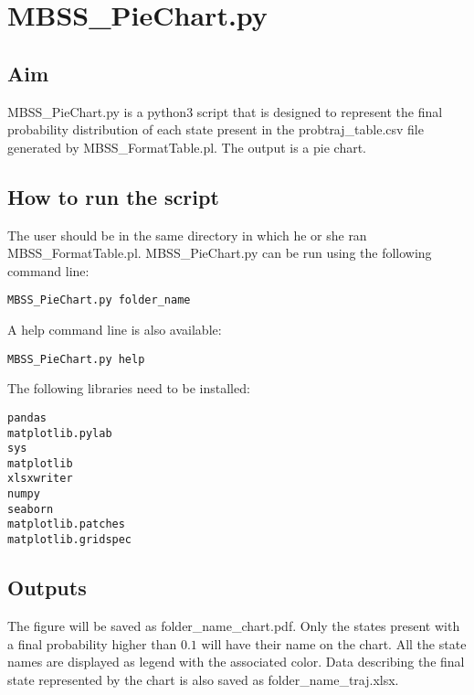 \documentclass{article}
\begin{document}
\section*{MBSS\_PieChart.py}
\subsection*{Aim}
MBSS\_PieChart.py is a python3 script that is designed to represent the final probability distribution 
of each state present in the probtraj\_table.csv file generated by MBSS\_FormatTable.pl. The output is a pie chart. 

\subsection*{How to run the script}
The user should be in the same directory in which he or she ran MBSS\_FormatTable.pl. MBSS\_PieChart.py can be run using the following command line: 
\begin{verbatim}
MBSS_PieChart.py folder_name
\end{verbatim}
A help command line is also available:
\begin{verbatim} 
MBSS_PieChart.py help
\end{verbatim}
The following libraries need to be installed:
\begin{verbatim}
pandas
matplotlib.pylab
sys
matplotlib
xlsxwriter
numpy
seaborn
matplotlib.patches
matplotlib.gridspec
\end{verbatim}

\subsection*{Outputs}
The figure will be saved as folder\_name\_chart.pdf. Only the states present with a final probability higher than $0.1$ will have their name on the 
chart. All the state names are displayed as legend with the associated color.
Data describing the final state represented by the chart is also saved as folder\_name\_traj.xlsx.
\end{document}
